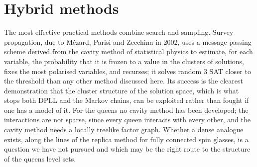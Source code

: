 \section{Hybrid methods}

The most effective practical methods combine search and sampling. Survey propagation, due to M\'ezard, Parisi and Zecchina in 2002, uses a message passing scheme derived from the cavity method of statistical physics to estimate, for each variable, the probability that it is frozen to a value in the clusters of solutions, fixes the most polarised variables, and recurses; it solves random $3$ SAT closer to the threshold than any other method discussed here. Its success is the clearest demonstration that the cluster structure of the solution space, which is what stops both DPLL and the Markov chains, can be exploited rather than fought if one has a model of it. For the queens no cavity method has been developed; the interactions are not sparse, since every queen interacts with every other, and the cavity method needs a locally treelike factor graph. Whether a dense analogue exists, along the lines of the replica method for fully connected spin glasses, is a question we have not pursued and which may be the right route to the structure of the queens level sets.
